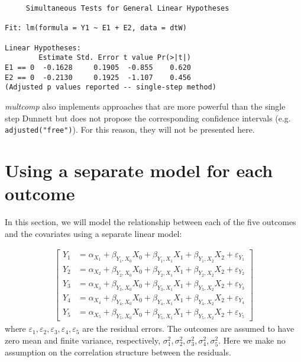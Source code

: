 \documentclass{article}
\begin{document}
\begin{verbatim}
	 Simultaneous Tests for General Linear Hypotheses

Fit: lm(formula = Y1 ~ E1 + E2, data = dtW)

Linear Hypotheses:
        Estimate Std. Error t value Pr(>|t|)
E1 == 0  -0.1628     0.1905  -0.855    0.620
E2 == 0  -0.2130     0.1925  -1.107    0.456
(Adjusted p values reported -- single-step method)
\end{verbatim}

\emph{multcomp} also implements approaches that are more powerful than the
single step Dunnett but does not propose the corresponding confidence
intervals (e.g. \texttt{adjusted("free")}). For this reason, they will not be
presented here.

\clearpage

\section{Using a separate model for each outcome}
\label{sec:org9c05834}

In this section, we will model the relationship between each of the
five outcomes and the covariates using a separate linear model:

\begin{align*}
\begin{bmatrix} 
Y_1  &= \alpha_{X_{1}} + \beta_{Y_1,X_0} X_{0} + \beta_{Y_1,X_1} X_{1} + \beta_{Y_1,X_2} X_{2} + \varepsilon_{Y_1} \\
Y_2  &= \alpha_{X_{2}} + \beta_{Y_2,X_0} X_{0} + \beta_{Y_2,X_1} X_{1} + \beta_{Y_2,X_2} X_{2} + \varepsilon_{Y_2} \\
Y_3  &= \alpha_{X_{3}} + \beta_{Y_3,X_0} X_{0} + \beta_{Y_3,X_1} X_{1} + \beta_{Y_3,X_2} X_{2} + \varepsilon_{Y_3} \\
Y_4  &= \alpha_{X_{4}} + \beta_{Y_4,X_0} X_{0} + \beta_{Y_4,X_1} X_{1} + \beta_{Y_4,X_2} X_{2} + \varepsilon_{Y_4} \\
Y_5  &= \alpha_{X_{5}} + \beta_{Y_5,X_0} X_{0} + \beta_{Y_5,X_1} X_{1} + \beta_{Y_5,X_2} X_{2} + \varepsilon_{Y_5} 
\end{bmatrix} 
\end{align*}
where
\(\varepsilon_{1},\varepsilon_{2},\varepsilon_{3},\varepsilon_{4},\varepsilon_{5}\)
are the residual errors. The outcomes are assumed to have zero mean
and finite variance, respectively,
\(\sigma^2_{1},\sigma^2_{2},\sigma^2_{3},\sigma^2_{4},\sigma^2_{5}\). Here
we make no assumption on the correlation structure between the
residuals.
\end{document}
